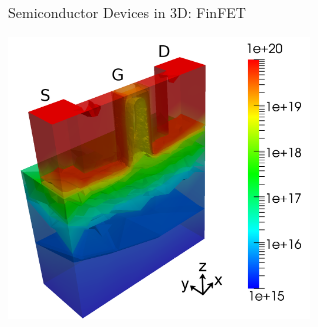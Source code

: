\documentclass[usepdftitle=false,10pt]{beamer}
\renewcommand{\vector}[1]{\boldsymbol{#1}}
\begin{document}
\begin{frame} {Semiconductor Devices in 3D: FinFET} 
  
 \begin{center} 
   \includegraphics[width=0.6\textwidth]{trigate-n-2}
 \end{center} 
 
\end{frame} 


%   
%  
%  
% 
%  
%  
 
\end{document}
